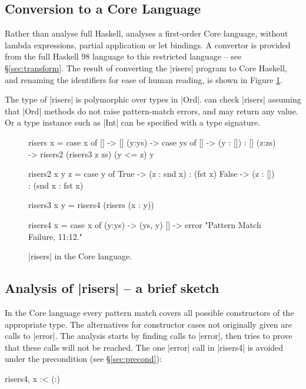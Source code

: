 \subsection{Conversion to a Core Language}

Rather than analyse full Haskell, \catch{} analyses a first-order Core language, without lambda expressions, partial application or let bindings. A convertor is provided from the full Haskell 98 language to this restricted language -- see \S\ref{sec:transform}. The result of converting the |risers| program to Core Haskell, and renaming the identifiers for ease of human reading, is shown in Figure \ref{fig:risers_core}.

The type of |risers| is polymorphic over types in |Ord|. \catch{} can check |risers| assuming that |Ord| methods do not raise pattern-match errors, and may return any value. Or a type instance such as |Int| can be specified with a type signature.

\begin{figure}
\begin{code}
risers x = case x of
    [] -> []
    (y:ys) ->  case ys of
         [] -> (y : []) : []
         (z:zs) -> risers2 (risers3 z zs) (y <= z) y

risers2 x y z =  case y of
    True -> (z : snd x) : (fst x)
    False -> (z : []) : (snd x : fst x)

risers3 x y = risers4 (risers (x : y))

risers4 x = case x of
    (y:ys) -> (ys, y)
    [] -> error "Pattern Match Failure, 11:12."
\end{code}
\caption{|risers| in the Core language.}
\label{fig:risers_core}
\end{figure}

\subsection{Analysis of |risers| -- a brief sketch}

In the Core language every pattern match covers all possible constructors of the appropriate type. The alternatives for constructor cases not originally given are calls to |error|. The analysis starts by finding calls to |error|, then tries to prove that these calls will not be reached. The one |error| call in |risers4| is avoided under the precondition (see \S\ref{sec:precond}):

\ignore\begin{code}
risers4, x :< (:)
\end{code}

